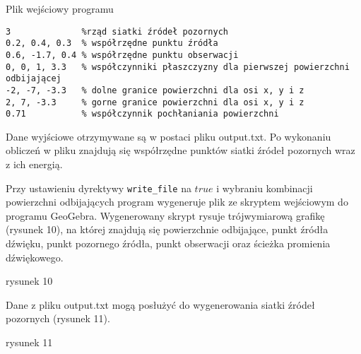 \begin{program}
\caption{Plik wejściowy programu}
\begin{lstlisting}
3              %rząd siatki źródeł pozornych
0.2, 0.4, 0.3  % współrzędne punktu źródła
0.6, -1.7, 0.4 % współrzędne punktu obserwacji
0, 0, 1, 3.3   % współczynniki płaszczyzny dla pierwszej powierzchni odbijającej 
-2, -7, -3.3   % dolne granice powierzchni dla osi x, y i z 
2, 7, -3.3     % gorne granice powierzchni dla osi x, y i z
0.71           % współczynnik pochłaniania powierzchni
\end{lstlisting}
\end{program}

Dane wyjściowe otrzymywane są w postaci pliku output.txt. Po wykonaniu obliczeń w pliku znajdują się współrzędne punktów siatki źródeł pozornych wraz z ich energią.

Przy ustawieniu dyrektywy \verb|write_file| na $true$ i wybraniu kombinacji powierzchni odbijających program wygeneruje plik ze skryptem wejściowym do programu GeoGebra. Wygenerowany skrypt rysuje trójwymiarową grafikę (rysunek 10), na której znajdują się powierzchnie odbijające, punkt źródła dźwięku, punkt pozornego źródła, punkt obserwacji oraz ścieżka promienia dźwiękowego.

rysunek 10

Dane z pliku output.txt mogą posłużyć do wygenerowania siatki źródeł pozornych (rysunek 11).

rysunek 11













